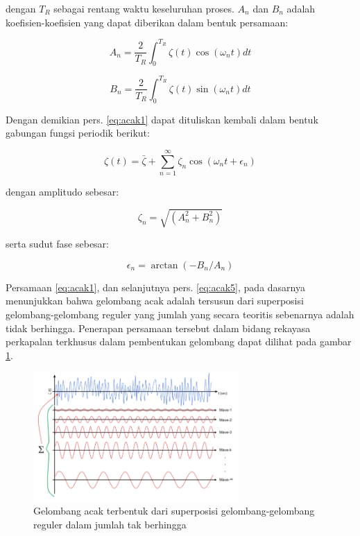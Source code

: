 dengan $T_R$ sebagai rentang waktu keseluruhan proses. $A_n$ dan $B_n$ adalah koefisien-koefisien yang dapat diberikan dalam bentuk persamaan:

\begin{equation}
A_n = \frac{2}{T_R}\int_0^{T_R}\zeta(t)\cos(\omega_nt)dt
\label{eq:acak3}
\end{equation}

\begin{equation}
B_n = \frac{2}{T_R}\int_0^{T_R}\zeta(t)\sin(\omega_nt)dt
\label{eq:acak4}
\end{equation}

Dengan demikian pers. \eqref{eq:acak1} dapat dituliskan kembali dalam bentuk gabungan fungsi periodik berikut:

\begin{equation}
\zeta(t) = \bar{\zeta} + \sum_{n=1}^{\infty}\zeta_n\cos(\omega_nt + \epsilon_n)
\label{eq:acak5}
\end{equation}

dengan amplitudo sebesar:

\begin{equation}
\zeta_n = \sqrt{(A_n^2 + B_n^2)}
\label{eq:acak6}
\end{equation}

serta sudut fase sebesar:

\begin{equation}
\epsilon_n = \arctan(-B_n/A_n)
\label{eq:acak7}
\end{equation}

Persamaan \eqref{eq:acak1}, dan selanjutnya pers. \eqref{eq:acak5}, pada dasarnya menunjukkan bahwa gelombang acak adalah tersusun dari superposisi gelombang-gelombang reguler yang jumlah yang secara teoritis sebenarnya adalah tidak berhingga. Penerapan persamaan tersebut dalam bidang rekayasa perkapalan terkhusus dalam pembentukan gelombang dapat dilihat pada gambar \ref{fig:pembentukan-gelombang-acak}.

\begin{figure}[!ht]
    \centering
    \includegraphics[width=0.7\textwidth]{gambar/pembentukan-gelombang-acak.jpg}
    \caption{Gelombang acak terbentuk dari superposisi gelombang-gelombang  reguler dalam jumlah tak berhingga}
    \label{fig:pembentukan-gelombang-acak}
\end{figure}


